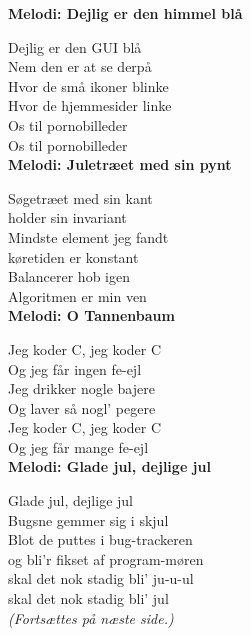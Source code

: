 
\vspace{-2.5mm}
\textbf{Melodi: Dejlig er den himmel blå}

Dejlig er den GUI blå\\
Nem den er at se derpå\\
Hvor de små ikoner blinke\\
Hvor de hjemmesider linke\\
Os til pornobilleder\\
Os til pornobilleder\\


\vspace{-2.5mm}
\textbf{Melodi: Juletræet med sin pynt}

Søgetræet med sin kant\\
holder sin invariant\\
Mindste element jeg fandt\\
køretiden er konstant\\
Balancerer hob igen\\
Algoritmen er min ven\\


\vspace{-2.5mm}
\textbf{Melodi: O Tannenbaum}

Jeg koder C, jeg koder C\\
Og jeg får ingen fe-ejl\\
Jeg drikker nogle bajere\\
Og laver så nogl' pegere\\
Jeg koder C, jeg koder C\\
Og jeg får mange fe-ejl\\


\vspace{-2.5mm}
\textbf{Melodi: Glade jul, dejlige jul}

Glade jul, dejlige jul\\
Bugsne gemmer sig i skjul\\
Blot de puttes i bug-trackeren\\
og bli'r fikset af program-møren\\
skal det nok stadig bli' ju-u-ul\\
skal det nok stadig bli' jul\\

\emph{(Fortsættes på næste side.)}

\newpage



